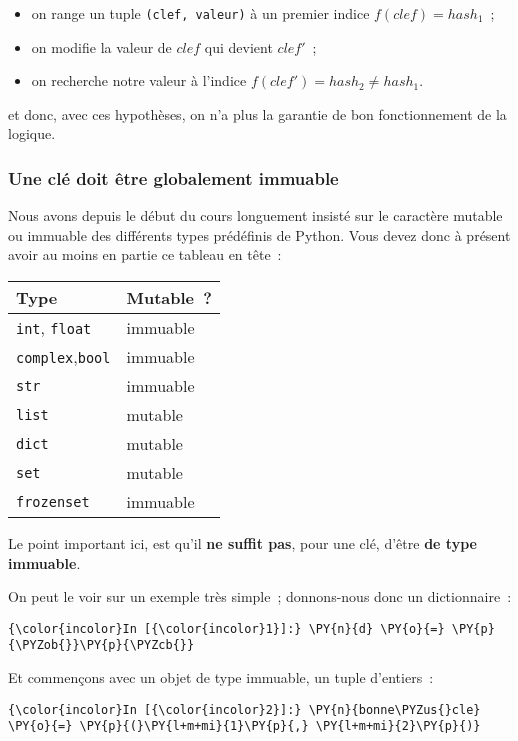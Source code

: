 \begin{itemize}
\tightlist
\item
  on range un tuple \texttt{(clef,\ valeur)} à un premier indice
  \(f(clef) = hash_1\)~;
\item
  on modifie la valeur de \(clef\) qui devient \(clef'\)~;
\item
  on recherche notre valeur à l'indice
  \(f(clef') = hash_2 \neq hash_1\).
\end{itemize}

et donc, avec ces hypothèses, on n'a plus la garantie de bon
fonctionnement de la logique.

    \hypertarget{une-cluxe9-doit-uxeatre-globalement-immuable}{%
\subsubsection{Une clé doit être globalement
immuable}\label{une-cluxe9-doit-uxeatre-globalement-immuable}}

    Nous avons depuis le début du cours longuement insisté sur le caractère
mutable ou immuable des différents types prédéfinis de Python. Vous
devez donc à présent avoir au moins en partie ce tableau en tête~:

\begin{longtable}[]{@{}ll@{}}
\toprule
Type & Mutable~?\tabularnewline
\midrule
\endhead
\texttt{int}, \texttt{float} & immuable\tabularnewline
\texttt{complex},\texttt{bool} & immuable\tabularnewline
\texttt{str} & immuable\tabularnewline
\texttt{list} & mutable\tabularnewline
\texttt{dict} & mutable\tabularnewline
\texttt{set} & mutable\tabularnewline
\texttt{frozenset} & immuable\tabularnewline
\bottomrule
\end{longtable}

    Le point important ici, est qu'il \textbf{ne suffit pas}, pour une clé,
d'être \textbf{de type immuable}.

On peut le voir sur un exemple très simple~; donnons-nous donc un
dictionnaire~:

    \begin{Verbatim}[commandchars=\\\{\},frame=single,framerule=0.3mm,rulecolor=\color{cellframecolor}]
{\color{incolor}In [{\color{incolor}1}]:} \PY{n}{d} \PY{o}{=} \PY{p}{\PYZob{}}\PY{p}{\PYZcb{}}
\end{Verbatim}


    Et commençons avec un objet de type immuable, un tuple d'entiers~:

    \begin{Verbatim}[commandchars=\\\{\},frame=single,framerule=0.3mm,rulecolor=\color{cellframecolor}]
{\color{incolor}In [{\color{incolor}2}]:} \PY{n}{bonne\PYZus{}cle} \PY{o}{=} \PY{p}{(}\PY{l+m+mi}{1}\PY{p}{,} \PY{l+m+mi}{2}\PY{p}{)}
\end{Verbatim}


